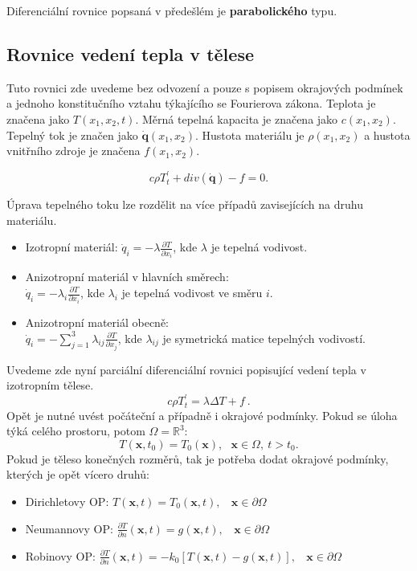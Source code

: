 Diferenciální rovnice popsaná v předešlém je \textbf{parabolického} typu.

\subsection{Rovnice vedení tepla v tělese}
Tuto rovnici zde uvedeme bez odvození a pouze s popisem okrajových podmínek a jednoho konstitučního vztahu týkajícího se Fourierova zákona. Teplota je značena jako $T(x_1,x_2,t)$. Měrná tepelná kapacita je značena jako $c(x_1,x_2)$. Tepelný tok je značen jako $\mathbf{\dot{q}}(x_1,x_2)$. Hustota materiálu je $\rho (x_1,x_2)$ a hustota vnitřního zdroje je značena $f(x_1,x_2)$.

\begin{equation}
c \rho T_t^\prime+div(\mathbf{\dot{q}})-f=0 .
\end{equation}

Úprava tepelného toku lze rozdělit na více případů zavisejících na druhu materiálu.
\begin{itemize}
\item Izotropní materiál:
$\dot{q}_i=-\lambda\frac{\partial T}{\partial x_i}$, kde $\lambda$ je tepelná vodivost.
\item Anizotropní materiál v hlavních směrech:\\
$\dot{q}_i=-\lambda_i \frac{\partial T}{\partial x_i}$, kde $\lambda_i$ je tepelná vodivost ve směru $i$.
\item Anizotropní materiál obecně:\\
$\dot{q}_i=-\sum_{j=1}^{3} \lambda_{ij}\frac{\partial T}{\partial x_j}$, kde $\lambda_{ij}$ je symetrická matice tepelných vodivostí.
\end{itemize}

Uvedeme zde nyní parciální diferenciální rovnici popisující vedení tepla v izotropním tělese.
\begin{equation}
c \rho T_t^\prime=\lambda\Delta T +f\ .
\label{diferencialnirovnicepopisujicivednitepla}    
\end{equation}
 Opět je nutné uvést počáteční a případně i okrajové podmínky. Pokud se úloha týká celého prostoru, potom $\Omega = \mathbb{R}^3$:
\begin{equation}
T(\mathbf{x},t_0)=T_0(\mathbf{x}),\ \ \ \mathbf{x}\in\Omega,\ t>t_0.
\label{pocatecnipodminkapopisujicivednitepla}   
\end{equation}
Pokud je těleso konečných rozměrů, tak je potřeba dodat okrajové podmínky, \mbox{kterých} je opět vícero druhů:
\begin{itemize}

\item Dirichletovy OP: $T(\mathbf{x},t)=T_0(\mathbf{x},t), \ \ \ \ \mathbf{x}\in \partial\Omega $
\item Neumannovy OP: $ \frac{\partial T}{\partial n}(\mathbf{x},t)=g(\mathbf{x},t),  \ \ \ \ \mathbf{x}\in \partial\Omega      $

\item Robinovy OP: $ \frac{\partial T}{\partial n}(\mathbf{x},t)=-k_0 [T(\mathbf{x},t)-g(\mathbf{x},t) ],\ \ \ \ \mathbf{x}\in\partial\Omega$

\end{itemize}

